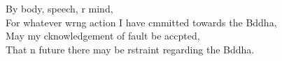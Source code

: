 
By body, speech, r mind,\\
For whatever wrng action I have cmmitted towards the Bddha,\\
May my cknowledgement of fault be accpted,\\
That n future there may be rstraint regarding the Bddha.

\clearpage

%
%
%
%
%
%
%
%
